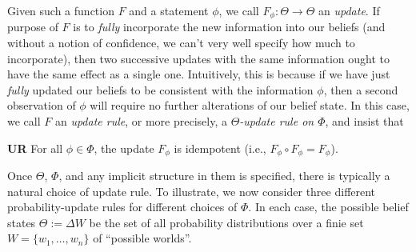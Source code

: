 \documentclass{article}
\begin{document}
Given such a function $F$ and a statement $\phi$, we call $F_\phi : \Theta \to \Theta$ an \emph{update}. 
If purpose of $F$ is to \emph{fully} incorporate the new information into our beliefs
(and without a notion of confidence, we can't very well specify how much to incorporate), then
two successive updates with the same information ought to have the same effect as a single one.
Intuitively, this is because if we have just \emph{fully} updated our beliefs to be consistent with the information $\phi$, then a second observation of $\phi$ will require no further alterations of our belief state.
In this case, we call $F$ an \emph{update rule}, or more precisely, a \emph{$\Theta$-update rule on $\Phi$}, and insist that
\begin{CFaxioms}
    \item[\textbf{UR}] For all $\phi \in \Phi$, the update $F_\phi$ is
    idempotent (i.e., $F_\phi \circ F_\phi = F_\phi$).
\end{CFaxioms}


Once $\Theta$, $\Phi$, and any implicit structure in them is specified, there is typically a natural choice of update rule. 
To illustrate, we now consider three different probability-update rules for different choices of $\Phi$.
In each case, the possible belief states $\Theta := \Delta W$ be the set of all probability distributions over a finie set $W = \{w_1, \ldots, w_n\}$ of ``possible worlds''. 
\end{document}
